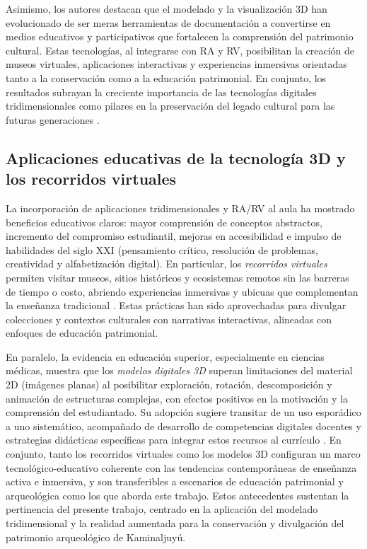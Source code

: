 Asimismo, los autores destacan que el modelado y la visualización 3D han evolucionado de ser meras herramientas de documentación a convertirse en medios educativos y participativos que fortalecen la comprensión del patrimonio cultural. Estas tecnologías, al integrarse con RA y RV, posibilitan la creación de museos virtuales, aplicaciones interactivas y experiencias inmersivas orientadas tanto a la conservación como a la educación patrimonial. En conjunto, los resultados subrayan la creciente importancia de las tecnologías digitales tridimensionales como pilares en la preservación del legado cultural para las futuras generaciones \cite{Skublewska2022}.

\subsection{Aplicaciones educativas de la tecnología 3D y los recorridos virtuales}

La incorporación de aplicaciones tridimensionales y \gls{RA}/\gls{RV} al aula ha mostrado beneficios educativos claros: mayor comprensión de conceptos abstractos, incremento del compromiso estudiantil, mejoras en accesibilidad e impulso de habilidades del siglo XXI (pensamiento crítico, resolución de problemas, creatividad y alfabetización digital). En particular, los \emph{recorridos virtuales} permiten visitar museos, sitios históricos y ecosistemas remotos sin las barreras de tiempo o costo, abriendo experiencias inmersivas y ubicuas que complementan la enseñanza tradicional \cite{CalbendMediaND}. Estas prácticas han sido aprovechadas para divulgar colecciones y contextos culturales con narrativas interactivas, alineadas con enfoques de educación patrimonial.

En paralelo, la evidencia en educación superior, especialmente en ciencias médicas, muestra que los \emph{modelos digitales 3D} superan limitaciones del material 2D (imágenes planas) al posibilitar exploración, rotación, descomposición y animación de estructuras complejas, con efectos positivos en la motivación y la comprensión del estudiantado. Su adopción sugiere transitar de un uso esporádico a uno sistemático, acompañado de desarrollo de competencias digitales docentes y estrategias didácticas específicas para integrar estos recursos al currículo \cite{Izquierdo2020}. En conjunto, tanto los recorridos virtuales como los modelos 3D configuran un marco tecnológico-educativo coherente con las tendencias contemporáneas de enseñanza activa e inmersiva, y son transferibles a escenarios de educación patrimonial y arqueológica como los que aborda este trabajo. Estos antecedentes sustentan la pertinencia del presente trabajo, centrado en la aplicación del modelado tridimensional y la realidad aumentada para la conservación y divulgación del patrimonio arqueológico de Kaminaljuyú.
